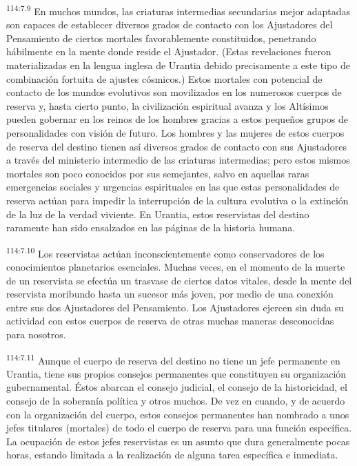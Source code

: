 \par
\textsuperscript{114:7.9} En muchos mundos, las criaturas intermedias secundarias mejor adaptadas son capaces de establecer diversos grados de contacto con los Ajustadores del Pensamiento de ciertos mortales favorablemente constituidos, penetrando hábilmente en la mente donde reside el Ajustador. (Estas revelaciones fueron materializadas en la lengua inglesa de Urantia debido precisamente a este tipo de combinación fortuita de ajustes cósmicos.) Estos mortales con potencial de contacto de los mundos evolutivos son movilizados en los numerosos cuerpos de reserva y, hasta cierto punto, la civilización espiritual avanza y los Altísimos pueden gobernar en los reinos de los hombres gracias a estos pequeños grupos de personalidades con visión de futuro. Los hombres y las mujeres de estos cuerpos de reserva del destino tienen así diversos grados de contacto con sus Ajustadores a través del ministerio intermedio de las criaturas intermedias; pero estos mismos mortales son poco conocidos por sus semejantes, salvo en aquellas raras emergencias sociales y urgencias espirituales en las que estas personalidades de reserva actúan para impedir la interrupción de la cultura evolutiva o la extinción de la luz de la verdad viviente. En Urantia, estos reservistas del destino raramente han sido ensalzados en las páginas de la historia humana.

\par
\textsuperscript{114:7.10} Los reservistas actúan inconscientemente como conservadores de los conocimientos planetarios esenciales. Muchas veces, en el momento de la muerte de un reservista se efectúa un trasvase de ciertos datos vitales, desde la mente del reservista moribundo hasta un sucesor más joven, por medio de una conexión entre sus dos Ajustadores del Pensamiento. Los Ajustadores ejercen sin duda su actividad con estos cuerpos de reserva de otras muchas maneras desconocidas para nosotros.

\par
\textsuperscript{114:7.11} Aunque el cuerpo de reserva del destino no tiene un jefe permanente en Urantia, tiene sus propios consejos permanentes que constituyen su organización gubernamental. Éstos abarcan el consejo judicial, el consejo de la historicidad, el consejo de la soberanía política y otros muchos. De vez en cuando, y de acuerdo con la organización del cuerpo, estos consejos permanentes han nombrado a unos jefes titulares (mortales) de todo el cuerpo de reserva para una función específica. La ocupación de estos jefes reservistas es un asunto que dura generalmente pocas horas, estando limitada a la realización de alguna tarea específica e inmediata.


